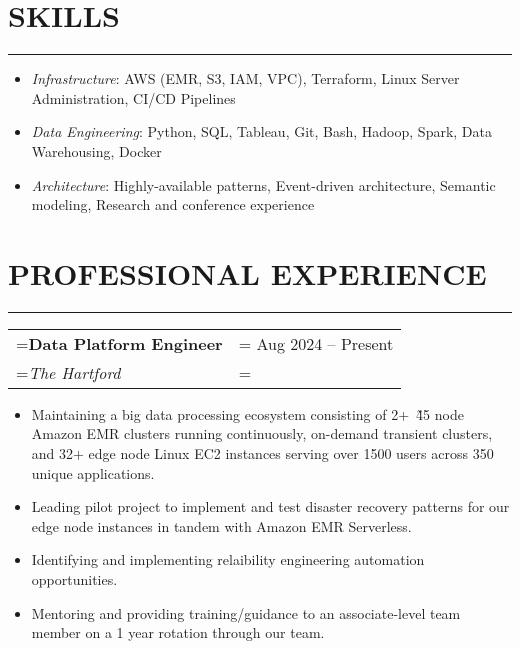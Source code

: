 \documentclass{article}
\begin{document}
\section*{\normalsize{SKILLS}}
\vspace{-1.8em}
\noindent\rule{\textwidth}{.5pt}
\begin{itemize}[label={}, leftmargin=1em]
    \setlength\itemsep{0em}
    \item \textit{Infrastructure}: AWS (EMR, S3, IAM, VPC), Terraform, Linux Server Administration, CI/CD Pipelines
    \item \textit{Data Engineering}: Python, SQL, Tableau, Git, Bash, Hadoop, Spark, Data Warehousing, Docker
    \item \textit{Architecture}: Highly-available patterns, Event-driven architecture, Semantic modeling, Research and conference experience 
\end{itemize}


\section*{\normalsize{PROFESSIONAL EXPERIENCE}}
\vspace{-1.8em}
\noindent\rule{\textwidth}{.5pt}

\vspace{.5em}
\hspace{-1em}
\begin{tabularx}{\textwidth}{
    >{\raggedright\arraybackslash\hsize=1\hsize\linewidth=\hsize}X
    >{\raggedleft\arraybackslash\hsize=1\hsize\linewidth=\hsize}X }
    \textbf{Data Platform Engineer} & Aug 2024 -- Present\\
    \textit{The Hartford} & \\
\end{tabularx}
\vspace{-.5em}
\begin{itemize}[label={--}, leftmargin=1em]
    \setlength\itemsep{0em}
    \item Maintaining a big data processing ecosystem consisting of 2+~\~45 node Amazon EMR clusters running continuously, on-demand transient clusters, and 32+ edge node Linux EC2 instances serving over 1500 users across 350 unique applications.
    \item Leading pilot project to implement and test disaster recovery patterns for our edge node instances in tandem with Amazon EMR Serverless.
    \item Identifying and implementing relaibility engineering automation opportunities.
    \item Mentoring and providing training/guidance to an associate-level team member on a 1 year rotation through our team.
\end{itemize}
\end{document}
